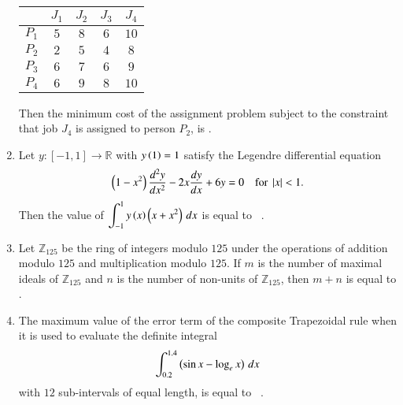 \documentclass[journal,12pt,onecolumn]{IEEEtran}
\theoremstyle{remark}
\begin{document}
\begin{enumerate}[start=1, label=Q.\arabic*]
\begin{table}[H]
\centering
\begin{tabular}{|c|c|c|c|c|}
\hline
 & $J_1$ & $J_2$ & $J_3$ & $J_4$ \\
\hline
$P_1$ & $5$ & $8$ & $6$ & $10$ \\
\hline
$P_2$ & $2$ & $5$ & $4$ & $8$ \\
\hline
$P_3$ & $6$ & $7$ & $6$ & $9$ \\
\hline
$P_4$ & $6$ & $9$ & $8$ & $10$ \\
\hline
\end{tabular}
\caption*{}
\label{tab:assign4x4}
\end{table}

Then the minimum cost of the assignment problem subject to the constraint that job $J_4$ is assigned to person $P_2$, is \underline{\hspace{2cm}}.

\hfill{}


\item Let $y: [-1,1]\to \mathbb{R}$ with $y\left(1\right)=1$ satisfy the Legendre differential equation
\[
\left(1-x^{2}\right)\frac{d^{2}y}{dx^{2}}-2x\frac{dy}{dx}+6y=0 \quad \text{for } \left\vert x\right\vert<1.
\]
Then the value of $\displaystyle \int_{-1}^{1} y\left(x\right)\left(x+x^{2}\right)\,dx$ is equal to \underline{\hspace{2cm}} \ .

\hfill{}

\item Let $\mathbb{Z}_{125}$ be the ring of integers modulo $125$ under the operations of addition modulo $125$ and multiplication modulo $125$. If $m$ is the number of maximal ideals of $\mathbb{Z}_{125}$ and $n$ is the number of non-units of $\mathbb{Z}_{125}$, then $m+n$ is equal to \underline{\hspace{2cm}}.

\hfill{}


\item The maximum value of the error term of the composite Trapezoidal rule when it is used to evaluate the definite integral
\[
\int_{0.2}^{1.4} \left(\sin x - \log_{e} x\right)\, dx
\]
with $12$ sub-intervals of equal length, is equal to \underline{\hspace{2cm}} \ .

\hfill{}



\end{enumerate}
\end{document}
